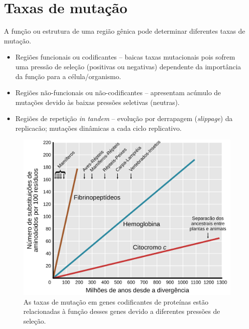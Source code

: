 \documentclass[
]{book}
\begin{document}
\hypertarget{taxas-de-mutauxe7uxe3o}{%
\section{Taxas de mutação}\label{taxas-de-mutauxe7uxe3o}}

A função ou estrutura de uma região gênica pode determinar diferentes taxas de mutação.

\begin{itemize}
\item
  Regiões funcionais ou codificantes -- baicas taxas mutacionais pois sofrem uma pressão de seleção (positivas ou negativas) dependente da importância da função para a célula/organismo.
\item
  Regiões não-funcionais ou não-codificantes -- apresentam acúmulo de mutações devido às baixas pressões seletivas (neutras).
\item
  Regiões de repetição \emph{in tandem} -- evolução por derrapagem (\emph{slippage}) da replicacão; mutações dinâmicas a cada ciclo replicativo.
\end{itemize}

\begin{figure}

{\centering \includegraphics[width=600px]{figs/molecular_clock} 

}

\caption{As taxas de mutação em genes codificantes de proteínas estão relacionadas à função desses genes devido a diferentes pressões de seleção.}\label{fig:relogiomolecular}
\end{figure}
\end{document}
